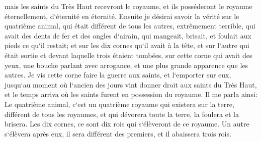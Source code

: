 \verse mais les saints du Très Haut recevront le royaume, et ils posséderont le royaume éternellement, d`éternité en éternité. 
\verse Ensuite je désirai savoir la vérité sur le quatrième animal, qui était différent de tous les autres, extrêmement terrible, qui avait des dents de fer et des ongles d`airain, qui mangeait, brisait, et foulait aux pieds ce qu`il restait; 
\verse et sur les dix cornes qu`il avait à la tête, et sur l`autre qui était sortie et devant laquelle trois étaient tombées, sur cette corne qui avait des yeux, une bouche parlant avec arrogance, et une plus grande apparence que les autres. 
\verse Je vis cette corne faire la guerre aux saints, et l`emporter sur eux, 
\verse jusqu`au moment où l`ancien des jours vint donner droit aux saints du Très Haut, et le temps arriva où les saints furent en possession du royaume. 
\verse Il me parla ainsi: Le quatrième animal, c`est un quatrième royaume qui existera sur la terre, différent de tous les royaumes, et qui dévorera toute la terre, la foulera et la brisera. 
\verse Les dix cornes, ce sont dix rois qui s`élèveront de ce royaume. Un autre s`élèvera après eux, il sera différent des premiers, et il abaissera trois rois. 
